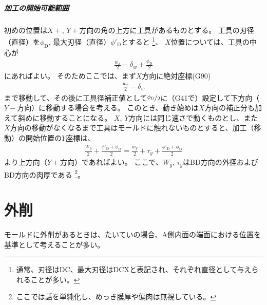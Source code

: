 \paragraph{加工の開始可能範囲}\noindent
初めの位置は$X+$, $Y+$方向の角の上方に工具があるものとする。
工具の刃径（直径）を$\phi_\mathrm D$, 最大刃径（直径）$\phi'_\mathrm D$とすると
\footnote{通常、刃径はDC、最大刃径はDCXと表記され、それぞれ直径として与えられることが多い。}、
$X$位置については、工具の中心が
\begin{align*}
  \frac{w_x}2-\delta_w+\frac{\phi_\mathrm D}2
\end{align*}
にあればよい。
そのためここでは、まず$X$方向に絶対座標(G90)
\begin{align*}
  \frac{w_x}2-\delta_w
\end{align*}
まで移動して、その後に工具径補正値として$\nicefrac{\phi_\mathrm D}2$に（G41で）設定して下方向（$Y-$方向）に移動する場合を考える。
このとき、動き始めは$X$方向の補正分も加えて斜めに移動することになる。
$X$, $Y$方向には同じ速さで動くものとし、また$X$方向の移動がなくなるまで工具はモールドに触れないものとすると、加工（移動）の開始位置の$Y$座標は、
\begin{align*}
  \frac{W_y}2+\frac{\phi'_\mathrm D+\phi_\mathrm D}2
  = \frac{w_y}2+\tau_y+\frac{\phi'_\mathrm D+\phi_\mathrm D}2
\end{align*}
より上方向（$Y+$方向）であればよい。
ここで、$W_y$, $\tau_y$はBD方向の外径およびBD方向の肉厚である
\footnote{ここでは話を単純化し、めっき膜厚や偏肉は無視している。}。




\chapter{外削}
モールドに外削があるときは、たいていの場合、A側内面の端面における位置を基準として考えることが多い。

